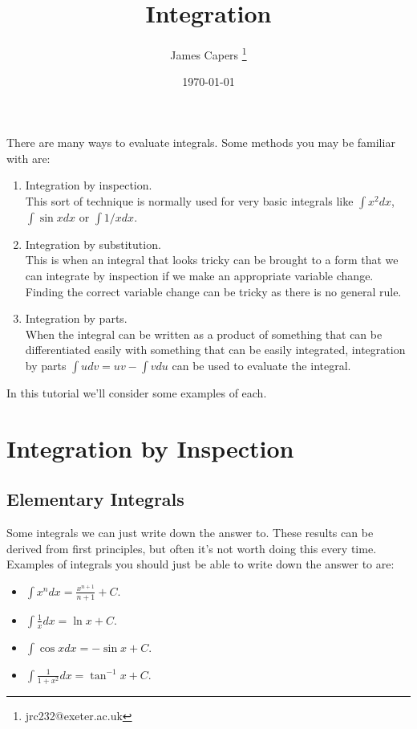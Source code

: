 \documentclass{article}
\title{Integration}
\author{James Capers \thanks{jrc232@exeter.ac.uk}}
\date{\today}
\begin{document}
\maketitle

There are many ways to evaluate integrals.
Some methods you may be familiar with are:
\begin{enumerate}
	\item{Integration by inspection.  \\ 
	This sort of technique is normally used for very basic integrals like $\int x^2 dx$, $\int \sin x dx$ or $\int 1/x dx$.}
	\item{Integration by substitution.  \\
	This is when an integral that looks tricky can be brought to a form that we can integrate by inspection if we make an appropriate variable change.  Finding the correct variable change can be tricky as there is no general rule.}
	\item{Integration by parts.  \\
	When the integral can be written as a product of something that can be differentiated easily with something that can be easily integrated, integration by parts $\int u dv = uv - \int v du$ can be used to evaluate the integral. }
\end{enumerate}
In this tutorial we'll consider some examples of each.

\section{Integration by Inspection}

\subsection{Elementary Integrals}

Some integrals we can just write down the answer to.
These results can be derived from first principles, but often it's not worth doing this every time.
Examples of integrals you should just be able to write down the answer to are:
\begin{itemize}
	\item{$\int x^n dx = \frac{ x^{n+1} }{n+1} + C$.}
	\item{$\int \frac{1}{x} dx = \ln x + C$.}
	\item{$\int \cos x dx = -\sin x + C$.}
	\item{$\int \frac{1}{1+x^2} dx = \tan^{-1} x + C$.}
\end{itemize}
\end{document}
